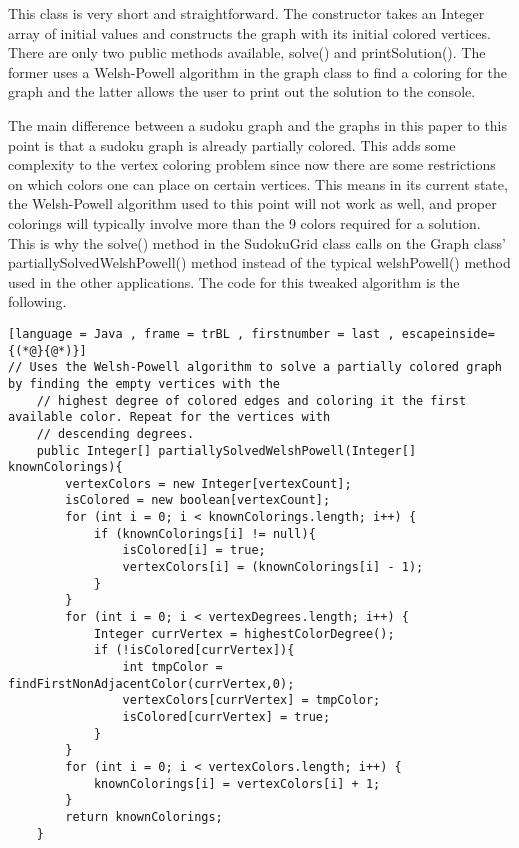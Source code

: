 \documentclass[12pt, letterpaper]{article}
\begin{document}
This class is very short and straightforward. The constructor takes an Integer array of initial values and constructs the graph with its initial colored vertices. There are only two public methods available, solve() and printSolution(). The former uses a Welsh-Powell algorithm in the graph class to find a coloring for the graph and the latter allows the user to print out the solution to the console.


The main difference between a sudoku graph and the graphs in this paper to this point is that a sudoku graph is already partially colored. This adds some complexity to the vertex coloring problem since now there are some restrictions on which colors one can place on certain vertices. This means in its current state, the Welsh-Powell algorithm used to this point will not work as well, and proper colorings will typically involve more than the 9 colors required for a solution. This is why the solve() method in the SudokuGrid class calls on the Graph class' partiallySolvedWelshPowell() method instead of the typical welshPowell() method used in the other applications. The code for this tweaked algorithm is the following.


\begin{lstlisting}[language = Java , frame = trBL , firstnumber = last , escapeinside={(*@}{@*)}]
// Uses the Welsh-Powell algorithm to solve a partially colored graph by finding the empty vertices with the
    // highest degree of colored edges and coloring it the first available color. Repeat for the vertices with
    // descending degrees.
    public Integer[] partiallySolvedWelshPowell(Integer[] knownColorings){
        vertexColors = new Integer[vertexCount];
        isColored = new boolean[vertexCount];
        for (int i = 0; i < knownColorings.length; i++) {
            if (knownColorings[i] != null){
                isColored[i] = true;
                vertexColors[i] = (knownColorings[i] - 1);
            }
        }
        for (int i = 0; i < vertexDegrees.length; i++) {
            Integer currVertex = highestColorDegree();
            if (!isColored[currVertex]){
                int tmpColor = findFirstNonAdjacentColor(currVertex,0);
                vertexColors[currVertex] = tmpColor;
                isColored[currVertex] = true;
            }
        }
        for (int i = 0; i < vertexColors.length; i++) {
            knownColorings[i] = vertexColors[i] + 1;
        }
        return knownColorings;
    }
\end{lstlisting}
\end{document}
